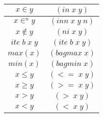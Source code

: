 \begin{tabular}{|c|c}
  \hline
  $x \in y$ & $(in \;x \;y)$ \\
  \hline
  $x \in^{n} y$ & $(inn \;x \;y \;n)$ \\
  \hline
  $x \notin y$ & $(ni \;x \;y)$ \\
  \hline
  $ite \;b \;x \;y$ & $(ite\;b\;x\;y)$ \\
  \hline
  $max(x)$ & $(bagmax \;x )$ \\
  \hline
  $min(x)$ & $(bagmin \;x )$ \\
  \hline
  $x \leq y$ & $(<= \;x \;y)$ \\
  \hline
  $x \geq y$ & $(>= \;x \;y)$ \\
  \hline
  $x > y$ & $(> \;x \;y)$ \\
  \hline
  $x < y$ & $(< \;x \;y)$ \\
  \hline


\end{tabular}


